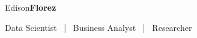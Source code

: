 \begin{center}
    {\fontsize{50}{40}\selectfont Edison\textbf{Florez}}

    \Large{
        Data Scientist ~|~ Business Analyst ~|~ Researcher
    }
\end{center}
